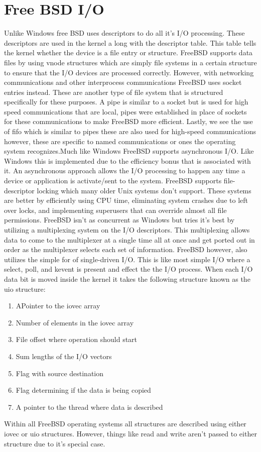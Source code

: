 \documentclass[onecolumn, draftclsnofoot,10pt, compsoc]{IEEEtran}
\begin{document}
\section{Free BSD I/O}
Unlike Windows free BSD uses descriptors to do all it's I/O processing. These descriptors are used in the kernel a long with the descriptor table. This table tells the kernel whether the device is a file entry or structure. FreeBSD supports data files by using vnode structures which are simply file systems in a certain structure to ensure that the I/O devices are processed correctly. However, with networking communications and other interprocess communications FreeBSD uses socket entries instead. These are another type of file system that is structured specifically for these purposes. A pipe is similar to a socket but is used for high speed communications that are local, pipes were established in place of sockets for these communications to make FreeBSD more efficient. Lastly, we see the use of fifo which is similar to pipes these are also used for high-speed communications however, these are specific to named communications or ones the operating system recognizes.Much like Windows FreeBSD supports asynchronous I/O. Like Windows this is implemented due to the efficiency bonus that is associated with it. An asynchronous approach allows the I/O processing to happen any time a device or application is activate/sent to the system. FreeBSD supports file-descriptor locking which many older Unix systems don't support. These systems are better by efficiently using CPU time, eliminating system crashes due to left over locks, and implementing superusers that can override almost all file permissions. FreeBSD isn't as concurrent as Windows but tries it's best by utilizing a multiplexing system on the I/O descriptors. This multiplexing allows data to come to the multiplexer at a single time all at once and get ported out in order as the multiplexer selects each set of information. FreeBSD however, also utilizes the simple for of single-driven I/O. This is like most simple I/O where a select, poll, and kevent is present and effect the the I/O process. When each I/O data bit is moved inside the kernel it takes the following structure known as the uio structure\cite{2}:
\begin{enumerate}
	\item APointer to the iovec array
	\item Number of elements in the iovec array
	\item File offset where operation should start
	\item Sum lengths of the I/O vectors
	\item Flag with source destination
	\item Flag determining if the data is being copied
	\item A pointer to the thread\cite{1} where data is described
\end{enumerate}
Within all FreeBSD operating systems all structures are described using either iovec or uio structures. However, things like read and write aren't passed to either structure due to it's special case\cite{2}.
\end{document}

